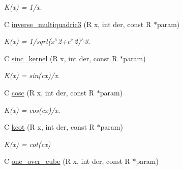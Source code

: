\begin{DoxyCompactItemize}
\begin{DoxyCompactList}\small\item\em K(x) = 1/x. \end{DoxyCompactList}\item 
\hypertarget{group__applications__fastsum_gacbd656d9965f2d58a0e15a5d8c2846e1}{C \hyperlink{group__applications__fastsum_gacbd656d9965f2d58a0e15a5d8c2846e1}{inverse\-\_\-multiquadric3} (R x, int der, const R $\ast$param)}\label{group__applications__fastsum_gacbd656d9965f2d58a0e15a5d8c2846e1}

\begin{DoxyCompactList}\small\item\em K(x) = 1/sqrt(x$^\wedge$2+c$^\wedge$2)$^\wedge$3. \end{DoxyCompactList}\item 
\hypertarget{group__applications__fastsum_ga66c347ec2ae4227d3861b93478388659}{C \hyperlink{group__applications__fastsum_ga66c347ec2ae4227d3861b93478388659}{sinc\-\_\-kernel} (R x, int der, const R $\ast$param)}\label{group__applications__fastsum_ga66c347ec2ae4227d3861b93478388659}

\begin{DoxyCompactList}\small\item\em K(x) = sin(cx)/x. \end{DoxyCompactList}\item 
\hypertarget{group__applications__fastsum_gaeaf0d62334bc7ed148e36f7c156b4dcc}{C \hyperlink{group__applications__fastsum_gaeaf0d62334bc7ed148e36f7c156b4dcc}{cosc} (R x, int der, const R $\ast$param)}\label{group__applications__fastsum_gaeaf0d62334bc7ed148e36f7c156b4dcc}

\begin{DoxyCompactList}\small\item\em K(x) = cos(cx)/x. \end{DoxyCompactList}\item 
\hypertarget{group__applications__fastsum_ga6e8f5f4db5202c22c8d966062f3099a0}{C \hyperlink{group__applications__fastsum_ga6e8f5f4db5202c22c8d966062f3099a0}{kcot} (R x, int der, const R $\ast$param)}\label{group__applications__fastsum_ga6e8f5f4db5202c22c8d966062f3099a0}

\begin{DoxyCompactList}\small\item\em K(x) = cot(cx) \end{DoxyCompactList}\item 
\hypertarget{group__applications__fastsum_ga55809d92b1b7edf6b4b8eaaaf64564e1}{C \hyperlink{group__applications__fastsum_ga55809d92b1b7edf6b4b8eaaaf64564e1}{one\-\_\-over\-\_\-cube} (R x, int der, const R $\ast$param)}\label{group__applications__fastsum_ga55809d92b1b7edf6b4b8eaaaf64564e1}


\end{DoxyCompactItemize}
